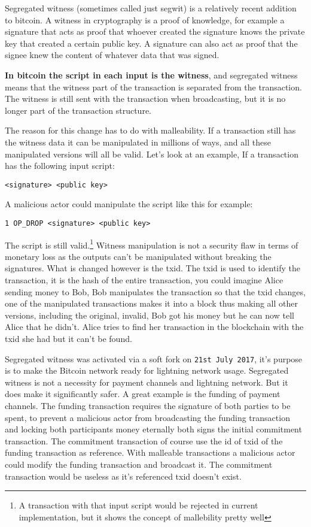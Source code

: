 \label{segwit}
Segregated witness (sometimes called just segwit) is a relatively recent addition to bitcoin. A witness in cryptography is a proof of knowledge, for example a signature that acts as proof that whoever created the signature knows the private key that created a certain public key. A signature can also act as proof that the signee knew the content of whatever data that was signed.

\textbf{In bitcoin the script in each input is the witness}, and segregated witness means that the witness part of the transaction is separated from the transaction. The witness is still sent with the transaction when broadcasting, but it is no longer part of the transaction structure.

The reason for this change has to do with malleability. If a transaction still has the witness data it can be manipulated in millions of ways, and all these manipulated versions will all be valid. Let's look at an example, If a transaction has the following input script:

\texttt{<signature> <public key>}

A malicious actor could manipulate the script like this for example:

\texttt{1 OP\_DROP <signature> <public key>}

The script is still valid.\footnote{A transaction with that input script would be rejected in current implementation, but it shows the concept of mallebility pretty well} Witness manipulation is not a security flaw in terms of monetary loss as the outputs can't be manipulated without breaking the signatures. What is changed however is the txid. The txid is used to identify the transaction, it is the hash of the entire transaction, you could imagine Alice sending money to Bob, Bob manipulates the transaction so that the txid changes, one of the manipulated transactions makes it into a block thus making all other versions, including the original, invalid, Bob got his money but he can now tell Alice that he didn't. Alice tries to find her transaction in the blockchain with the txid she had but it can't be found.

Segregated witness was activated via a soft fork on \texttt{21st July 2017}, it's purpose is to make the Bitcoin network ready for lightning network usage. Segregated witness is not a necessity for payment channels and lightning network. But it does make it significantly safer. A great example is the funding of payment channels. The funding transaction requires the signature of both parties to be spent, to prevent a malicious actor from broadcasting the funding transaction and locking both participants money eternally both signs the initial commitment transaction. The commitment transaction of course use the id of txid of the funding transaction as reference. With malleable transactions a malicious actor could modify the funding transaction and broadcast it. The commitment transaction would be useless as it's referenced txid doesn't exist.


